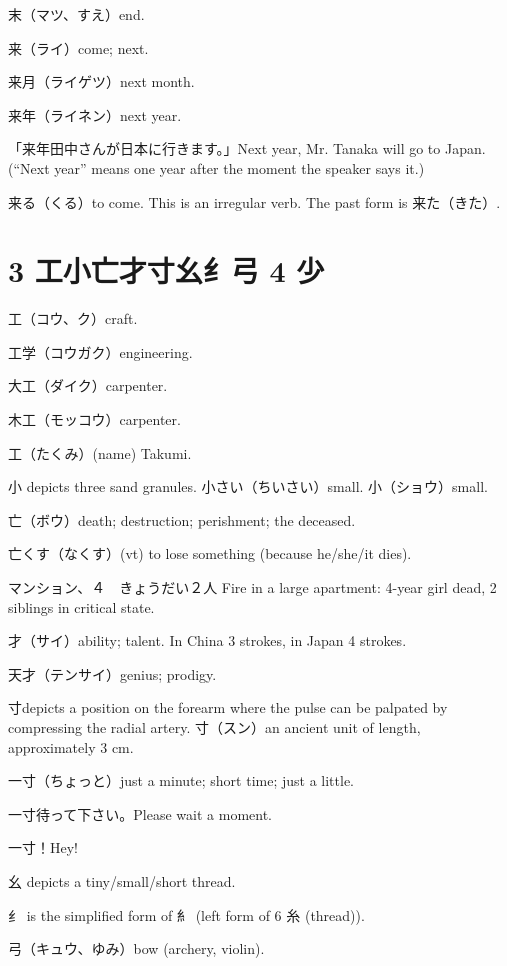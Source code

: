 末（マツ、すえ）end.

来（ライ）come; next.

来月（ライゲツ）next month.

来年（ライネン）next year.

「来年田中さんが日本に行きます。」Next year, Mr. Tanaka will go to Japan.
(``Next year'' means one year after the moment the speaker says it.)

来る（くる）to come.
This is an irregular verb.
The past form is 来た（きた）.

\section{3 工小亡才寸幺纟弓 4 少}

工（コウ、ク）craft.

工学（コウガク）engineering.

大工（ダイク）carpenter.

木工（モッコウ）carpenter.

工（たくみ）(name) Takumi.

小 depicts three sand granules.
小さい（ちいさい）small.
小（ショウ）small.

亡（ボウ）death; destruction; perishment; the deceased.

亡くす（なくす）(vt) to lose something (because he/she/it dies).

マンション、４　きょうだい２人
Fire in a large apartment: 4-year girl dead, 2 siblings in critical state.

才（サイ）ability; talent.
In China 3 strokes, in Japan 4 strokes.

天才（テンサイ）genius; prodigy.

寸depicts a position on the forearm
where the pulse can be palpated by compressing the radial artery.
寸（スン）an ancient unit of length, approximately 3 cm.

一寸（ちょっと）just a minute; short time; just a little.

一寸待って下さい。Please wait a moment.

一寸！Hey!

幺 depicts a tiny/small/short thread.

纟 is the simplified form of 糹
(left form of 6 糸 (thread)).

弓（キュウ、ゆみ）bow (archery, violin).

